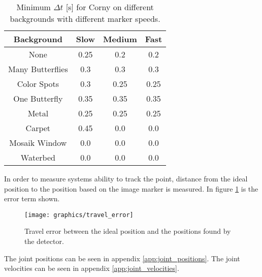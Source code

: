 
\begin{table}[H]
\center
\begin{tabular}{|c|c|c|c|}
\hline
Background & Slow & Medium & Fast \\ \hline
None & 0.25 & 0.2 & 0.2\\ \hline 
Many Butterflies & 0.3 & 0.3 & 0.3\\ \hline 
Color Spots & 0.3 & 0.25 & 0.25\\ \hline 
One Butterfly & 0.35 & 0.35 & 0.35\\ \hline 
Metal & 0.25 & 0.25 & 0.25\\ \hline 
Carpet & 0.45 & 0.0 & 0.0 \\ \hline
Mosaik Window & 0.0 & 0.0 & 0.0 \\ \hline
Waterbed & 0.0 & 0.0 & 0.0 \\ \hline
\end{tabular}
\caption{Minimum $\Delta t$ [s] for Corny on different backgrounds with different marker speeds.}
\label{tb:min_dt_corny}
\end{table}

In order to measure systems ability to track the point, distance from the ideal position to the position based on the image marker is measured.
In figure \ref{fig:travel_error} is the error term shown.

\begin{figure}
 \centering
 \texttt{[image: graphics/travel\_error]} %
 \caption{Travel error between the ideal position and the positions found by the detector.}
 \label{fig:travel_error}
\end{figure}

The joint positions can be seen in appendix \ref{app:joint_positions}.
The joint velocities can be seen in appendix \ref{app:joint_velocities}.